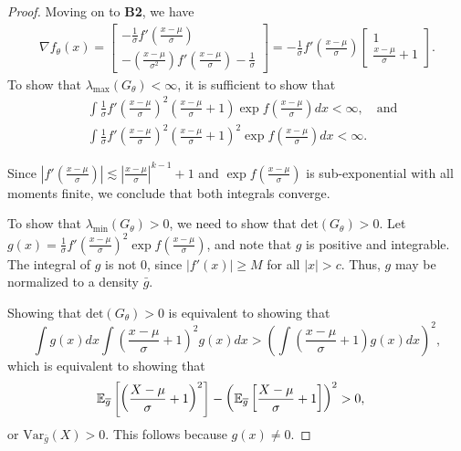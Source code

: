 \documentclass{article}
\begin{document}
\begin{proof}
Moving on to \textbf{B2}, we have
\begin{align*}
\nabla f_\theta(x) = \left[ \begin{array}{c}
           - \frac{1}{\sigma} f'\left( \frac{x - \mu}{\sigma} \right) \\
           -\left( \frac{x - \mu}{\sigma^2} \right) f'\left( \frac{x - \mu}{\sigma} \right) - \frac{1}{\sigma} 
        \end{array} \right]
%
   = - \frac{1}{\sigma} f'\left( \frac{x - \mu}{\sigma} \right)  \left[ \begin{array}{c}
           1  \\
           \frac{x - \mu}{\sigma} + 1  
        \end{array} \right].
\end{align*}
To show that $\lambda_{\max}(G_\theta) < \infty$, it is sufficient to show that 
\begin{align*}
&\int \frac{1}{\sigma} f'\left( \frac{x - \mu}{\sigma} \right)^2 \left( \frac{x -\mu}{\sigma} + 1 \right) 
          \exp f \left( \frac{x - \mu}{\sigma} \right) dx < \infty, \quad \text{and} \\
& \int \frac{1}{\sigma} f'\left( \frac{x - \mu}{\sigma} \right)^2 \left( \frac{x -\mu}{\sigma} + 1 \right)^2 
          \exp f \left( \frac{x - \mu}{\sigma} \right) dx < \infty.
\end{align*}

Since $\left| f'\left( \frac{x - \mu}{\sigma} \right) \right| \lesssim \left| \frac{x - \mu}{\sigma} \right|^{k-1} + 1$ and $\exp f\left( \frac{x - \mu}{\sigma} \right)$ is sub-exponential with all moments finite, we conclude that both integrals converge. 

To show that $\lambda_{\min}(G_\theta) > 0$, we need to show that $\textrm{det}(G_\theta) > 0$. Let $g(x) = \frac{1}{\sigma} f'\left( \frac{x - \mu}{\sigma} \right)^2 \exp f \left( \frac{x - \mu}{\sigma} \right)$, and note that $g$ is positive and integrable. The integral of $g$ is not 0, since $|f'(x)| \geq M$ for all $|x| > c$. Thus, $g$ may be normalized to a density $\bar{g}$.

Showing that $\textrm{det}(G_\theta) > 0$ is equivalent to showing that
\[
\int g(x) dx \int \left( \frac{x - \mu}{\sigma} + 1 \right)^2 g(x) dx >  
     \left( \int \left(\frac{ x - \mu}{\sigma} + 1 \right) g(x) dx \right)^2 ,
\]
which is equivalent to showing that
\begin{align*}
{\mathbb E}_{\overline{g}} \left[ \left( \frac{X - \mu}{\sigma} + 1 \right)^2 \right] - 
   \left( {\mathbb E}_{\overline{g}} \left[ \frac{X - \mu}{\sigma} +1 \right] \right)^2 &> 0,
\end{align*}
or $\textrm{Var}_{\bar{g}} (X)  > 0$. This follows because $g(x) \neq 0$.


\end{proof}
\end{document}

